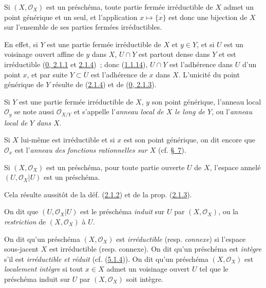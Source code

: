 \begin{proposition}[2.1.5]
\label{I.2.1.5-fr}
Si $(X,\mathscr{O}_X)$ est un préschéma, toute partie fermée irréductible de
$X$ admet un point générique et un seul, et l'application
$x\longmapsto\overline{\{x\}}$ est donc une bijection de $X$ sur l'ensemble
de ses parties fermées irréductibles.
\end{proposition}

En effet, si $Y$ est une partie fermée irréductible de $X$ et $y\in Y$, et si
$U$ est un voisinage ouvert affine de $y$ dans $X$, $U\cap Y$ est partout
dense dans $Y$ et est irréductible
(\hyperref[0.2.1.1-fr]{0, 2.1.1} et
\hyperref[0.2.1.4-fr]{2.1.4})~; donc
(\hyperref[I.1.1.14-fr]{1.1.14}), $U\cap Y$ est l'adhérence dans $U$ d'un
point $x$, et par suite $Y\subset\overline{U}$ est l'adhérence de $x$ dans
$X$. L'unicité du point générique de $Y$ résulte de
(\hyperref[I.2.1.4-fr]{2.1.4}) et de
(\hyperref[0.2.1.3-fr]{0, 2.1.3}).

\begin{env}[2.1.6]
\label{I.2.1.6-fr}
Si $Y$ est une partie fermée irréductible de $X$, $y$ son point générique,
l'anneau local $\mathscr{O}_y$ se note aussi $\mathscr{O}_{X/Y}$ et s'appelle
l'\emph{anneau local de $X$ le long de $Y$}, ou l'\emph{anneau local de $Y$
dans $X$}.

Si $X$ lui-même est irréductible et si $x$ est son point générique, on dit
encore que $\mathscr{O}_x$ est l'\emph{anneau des fonctions rationnelles sur
$X$} (cf. \hyperref[section:I.7-fr]{§~7}).
\end{env}

\begin{proposition}[2.1.7]
\label{I.2.1.7-fr}
Si $(X,\mathscr{O}_X)$ est un préschéma, pour toute partie ouverte $U$ de $X$,
l'espace annelé $(U,\mathscr{O}_X|U)$ est un préschéma.
\end{proposition}

Cela résulte aussitôt de la déf. (\hyperref[I.2.1.2-fr]{2.1.2}) et de la prop.
(\hyperref[I.2.1.3-fr]{2.1.3}).

On dit que $(U,\mathscr{O}_X|U)$ est le préschéma \emph{induit} sur $U$ par
$(X,\mathscr{O}_X)$, ou la \emph{restriction} de $(X,\mathscr{O}_X)$ à $U$.

\begin{env}[2.1.8]
\label{I.2.1.8-fr}
On dit qu'un préschéma $(X,\mathscr{O}_X)$ est \emph{irréductible} (resp.
\emph{connexe}) si l'espace sous-jacent $X$ est irréductible (resp. connexe).
On dit qu'un préschéma est \emph{intègre} s'il est \emph{irréductible et
réduit} (cf. (\hyperref[I.5.1.4-fr]{5.1.4})). On dit qu'un préschéma
$(X,\mathscr{O}_X)$ est \emph{localement intègre} si tout $x\in X$ admet un
voisinage ouvert $U$ tel que le préschéma induit sur $U$ par
$(X,\mathscr{O}_X)$ soit intègre.
\end{env}

